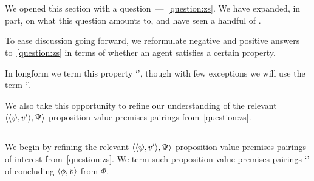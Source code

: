 \section{}

\begin{note}
  We opened this section with a question~---~\autoref{question:zs}.
  We have expanded, in part, on what this question amounts to, and have seen a handful of .

  To ease discussion going forward, we reformulate negative and positive answers to~\autoref{question:zs} in terms of whether an agent satisfies a certain property.

  In longform we term this property `', though with few exceptions we will use the term `'.

  We also take this opportunity to refine our understanding of the relevant \(\langle \langle \psi, v' \rangle, \Psi \rangle\) proposition-value-premises pairings from~\autoref{question:zs}.
\end{note}

\subsection{}

\begin{note}
  We begin by refining the relevant \(\langle \langle \psi, v' \rangle, \Psi \rangle\) proposition-value-premises pairings of interest from~\autoref{question:zs}.
  We term such proposition-value-premises pairings `' of concluding \(\langle \phi, v \rangle\) from \(\Phi\).
\end{note}

